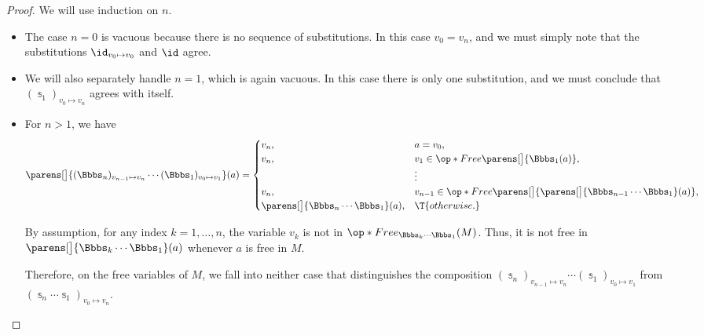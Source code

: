 \begin{proof}
  We will use induction on \( n \).
  \begin{itemize}
    \item The case \( n = 0 \) is vacuous because there is no sequence of substitutions. In this case \( v_0 = v_n \), and we must simply note that the substitutions \( \id_{v_0 \mapsto v_0} \) and \( \id \) agree.

    \item We will also separately handle \( n = 1 \), which is again vacuous. In this case there is only one substitution, and we must conclude that \( (\Bbbs_1)_{v_0 \mapsto v_n} \) agrees with itself.

    \item For \( n > 1 \), we have
    \begin{equation*}
      \parens[\big]{ (\Bbbs_n)_{v_{n-1} \mapsto v_n} \cdots (\Bbbs_1)_{v_0 \mapsto v_1} }(a)
      =
      \begin{cases}
        v_n,                                        &a = v_0, \\
        v_n,                                        &v_1 \in \op*{Free}\parens[\big]{ \Bbbs_1(a) }, \\
                                                    &\vdots \\
        v_n,                                        &v_{n-1} \in \op*{Free}\parens[\big]{ \parens[\big]{ \Bbbs_{n-1} \cdots \Bbbs_1 }(a) }, \\
        \parens[\big]{ \Bbbs_n \cdots \Bbbs_1 }(a), &\T{otherwise.}
      \end{cases}
    \end{equation*}

    By assumption, for any index \( k = 1, \ldots, n \), the variable \( v_k \) is not in \( \op*{Free}_{\Bbbs_k \cdots \Bbbs_1}(M) \). Thus, it is not free in \( \parens[\big]{ \Bbbs_k \cdots \Bbbs_1 }(a) \) whenever \( a \) is free in \( M \).

    Therefore, on the free variables of \( M \), we fall into neither case that distinguishes the composition \( (\Bbbs_n)_{v_{n-1} \mapsto v_n} \cdots (\Bbbs_1)_{v_0 \mapsto v_1} \) from \( (\Bbbs_n \cdots \Bbbs_1)_{v_0 \mapsto v_n} \).
  \end{itemize}
\end{proof}

